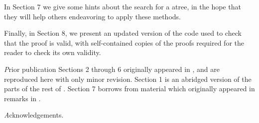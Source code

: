 In Section 7 we give some hints about the search for a atree,
in the hope that they will help others endeavoring to apply these methods.

Finally, in Section 8, we present an updated version of
the code used to check that the proof is valid,
with self-contained copies of the proofs required for the reader
to check its own validity.

{\textit Prior publication}
Sections 2 through 6 originally appeared in \cite{GMT},
and are reproduced here with only minor revision.
Section 1 is an abridged version of the parts of the rest of \cite{GMT}.
Section 7 borrows from material which originally appeared in remarks in \cite{GMT}.

{\textit Acknowledgements}.
